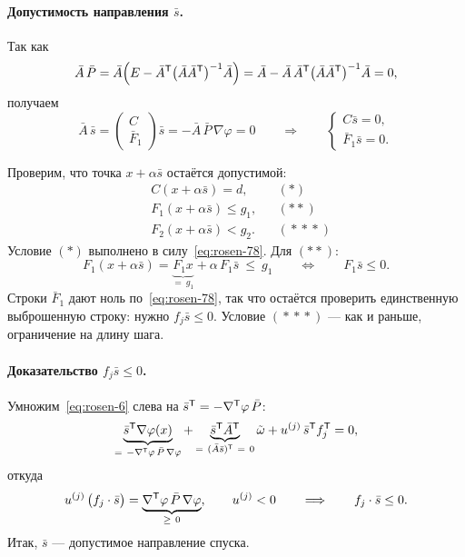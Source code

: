 \paragraph{Допустимость направления $\bar{s}$.}
Так как
\[
  \bar{A}\,\bar{P}
  = \bar{A}\Big(E - \bar{A}^{\mathsf{T}}\big(\bar{A}\bar{A}^{\mathsf{T}}\big)^{-1}\bar{A}\Big)
  = \bar{A} - \bar{A}\,\bar{A}^{\mathsf{T}}\big(\bar{A}\bar{A}^{\mathsf{T}}\big)^{-1}\bar{A} = 0 ,
\]
получаем
\[
  \bar{A}\,\bar{s}
  = \begin{pmatrix} C \\ \hline \bar{F}_1 \end{pmatrix} \bar{s}
  = -\bar{A}\,\bar{P}\,\nabla\varphi = 0
  \qquad\Longrightarrow\qquad
  \begin{cases}
    C \bar{s} = 0 , \\
    \bar{F}_1 \bar{s} = 0 .
  \end{cases}
  \tag{7--8}\label{eq:rosen-78}
\]

Проверим, что точка $x + \alpha\bar{s}$ остаётся допустимой:
\[
  \begin{aligned}
    &C(x + \alpha\bar{s}) = d , &&(*) \\
    &F_1(x + \alpha\bar{s}) \le g_1 , &&(**) \\
    &F_2(x + \alpha\bar{s}) < g_2 . &&(\!*\!*\!*)
  \end{aligned}
\]
Условие $(*)$ выполнено в силу~\eqref{eq:rosen-78}. Для $(**)$:
\[
  F_1(x + \alpha\bar{s})
  = \underbrace{F_1 x}_{=\ g_1} + \alpha\, F_1 \bar{s} \ \le\ g_1
  \qquad\Longleftrightarrow\qquad
  F_1 \bar{s} \le 0 .
\]
Строки $\bar{F}_1$ дают ноль по~\eqref{eq:rosen-78}, так что остаётся проверить
единственную выброшенную строку: нужно $f_j \bar{s} \le 0$. Условие
$(\!*\!*\!*)$ — как и раньше, ограничение на длину шага.

\paragraph{Доказательство $f_j \bar{s} \le 0$.}
Умножим~\eqref{eq:rosen-6} слева на $\bar{s}^{\mathsf{T}} = -\nabla^{\mathsf{T}}\varphi\,\bar{P}$:
\[
  \underbrace{\bar{s}\T \nabla\varphi(x)}_{=\ -\nabla\T\varphi\,\bar{P}\,\nabla\varphi}
  + \underbrace{\bar{s}\T \bar{A}\T}_{=\ (\bar{A}\bar{s})\T\ =\ 0} \tilde\omega
  + u^{(j)}\, \bar{s}\T f_j\T = 0 ,
\]
откуда
\[
  u^{(j)}\,\big(f_j \cdot \bar{s}\big)
  = \underbrace{\nabla^{\mathsf{T}}\varphi\,\bar{P}\,\nabla\varphi}_{\ge\ 0} ,
  \qquad u^{(j)} < 0
  \qquad\Longrightarrow\qquad
  f_j \cdot \bar{s} \le 0 .
\]
Итак, $\bar{s}$ — допустимое направление спуска.

